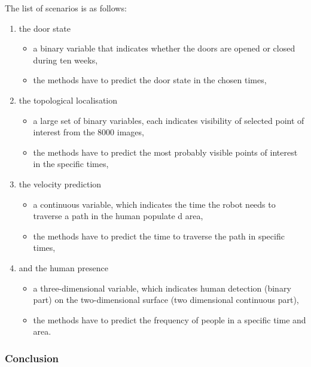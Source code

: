The list of scenarios is as follows:
\begin{enumerate}
    \item the door state
    \begin{itemize}
        \item a binary variable that indicates whether the doors are opened or closed during ten weeks,
        \item the methods have to predict the door state in the chosen times,
    \end{itemize}
    \item the topological localisation
    \begin{itemize}
        \item a large set of binary variables, each indicates visibility of selected point of interest from the $8000$ images,
        \item the methods have to predict the most probably visible points of interest in the specific times,
    \end{itemize}
    \item the velocity prediction
    \begin{itemize}
        \item a continuous variable, which indicates the time the robot needs to traverse a path in the human populate
d area,
        \item the methods have to predict the time to traverse the path in specific times,
    \end{itemize}
    \item and the human presence
    \begin{itemize}
        \item a three-dimensional variable, which indicates human detection (binary part) on the two-dimensional surface (two dimensional continuous part),
        \item the methods have to predict the frequency of people in a specific time and area.
    \end{itemize}
\end{enumerate}

\subsubsection{Conclusion}
%


